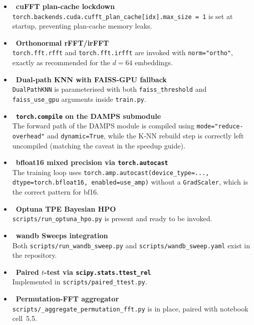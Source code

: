 \documentclass[11pt,a4paper]{article}
\newcommand{\cmark}{\textcolor{okgreen}{\ding{51}}}
\begin{document}
\begin{itemize}[leftmargin=1.4em,itemsep=2pt]
    \item \cmark\ \textbf{cuFFT plan-cache lockdown} \\
          \texttt{torch.backends.cuda.cufft\_plan\_cache[idx].max\_size = 1} is set
          at startup, preventing plan-cache memory leaks.
    \item \cmark\ \textbf{Orthonormal rFFT/irFFT} \\
          \texttt{torch.fft.rfft} and \texttt{torch.fft.irfft} are invoked with
          \texttt{norm="ortho"}, exactly as recommended for the $d{=}64$ embeddings.
    \item \cmark\ \textbf{Dual-path KNN with FAISS-GPU fallback} \\
          \texttt{DualPathKNN} is parameterised with both
          \texttt{faiss\_threshold} and \texttt{faiss\_use\_gpu} arguments inside
          \texttt{train.py}.
    \item \cmark\ \textbf{\texttt{torch.compile} on the DAMPS submodule} \\
          The forward path of the DAMPS module is compiled using
          \texttt{mode="reduce-overhead"} and \texttt{dynamic=True}, while the
          K-NN rebuild step is correctly left uncompiled (matching the caveat
          in the speedup guide).
    \item \cmark\ \textbf{bfloat16 mixed precision via \texttt{torch.autocast}} \\
          The training loop uses
          \texttt{torch.amp.autocast(device\_type=..., dtype=torch.bfloat16, enabled=use\_amp)}
          without a \texttt{GradScaler}, which is the correct pattern for bf16.
    \item \cmark\ \textbf{Optuna TPE Bayesian HPO} \\
          \texttt{scripts/run\_optuna\_hpo.py} is present and ready to be invoked.
    \item \cmark\ \textbf{wandb Sweeps integration} \\
          Both \texttt{scripts/run\_wandb\_sweep.py} and
          \texttt{scripts/wandb\_sweep.yaml} exist in the repository.
    \item \cmark\ \textbf{Paired $t$-test via \texttt{scipy.stats.ttest\_rel}} \\
          Implemented in \texttt{scripts/paired\_ttest.py}.
    \item \cmark\ \textbf{Permutation-FFT aggregator} \\
          \texttt{scripts/\_aggregate\_permutation\_fft.py} is in place, paired
          with notebook cell~5.5.
\end{itemize}
\end{document}
